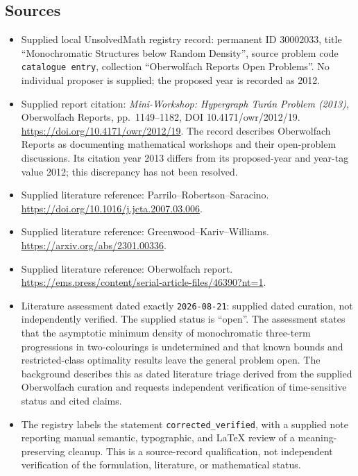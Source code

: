 \documentclass[11pt]{article}
\begin{document}
\subsection{Sources}
\begin{itemize}
\item Supplied local UnsolvedMath registry record: permanent ID \(30002033\), title ``Monochromatic Structures below Random Density'', source problem code \texttt{catalogue entry}, collection ``Oberwolfach Reports Open Problems''. No individual proposer is supplied; the proposed year is recorded as 2012.
\item Supplied report citation: \emph{Mini-Workshop: Hypergraph Tur\'an Problem (2013)}, Oberwolfach Reports, pp.~1149--1182, DOI 10.4171/owr/2012/19. \url{https://doi.org/10.4171/owr/2012/19}. The record describes Oberwolfach Reports as documenting mathematical workshops and their open-problem discussions. Its citation year 2013 differs from its proposed-year and year-tag value 2012; this discrepancy has not been resolved.
\item Supplied literature reference: Parrilo--Robertson--Saracino. \url{https://doi.org/10.1016/j.jcta.2007.03.006}.
\item Supplied literature reference: Greenwood--Kariv--Williams. \url{https://arxiv.org/abs/2301.00336}.
\item Supplied literature reference: Oberwolfach report. \url{https://ems.press/content/serial-article-files/46390?nt=1}.
\item Literature assessment dated exactly \texttt{2026-08-21}: supplied dated curation, not independently verified. The supplied status is ``open''. The assessment states that the asymptotic minimum density of monochromatic three-term progressions in two-colourings is undetermined and that known bounds and restricted-class optimality results leave the general problem open. The background describes this as dated literature triage derived from the supplied Oberwolfach curation and requests independent verification of time-sensitive status and cited claims.
\item The registry labels the statement \texttt{corrected\_verified}, with a supplied note reporting manual semantic, typographic, and LaTeX review of a meaning-preserving cleanup. This is a source-record qualification, not independent verification of the formulation, literature, or mathematical status.
\end{itemize}
\end{document}

